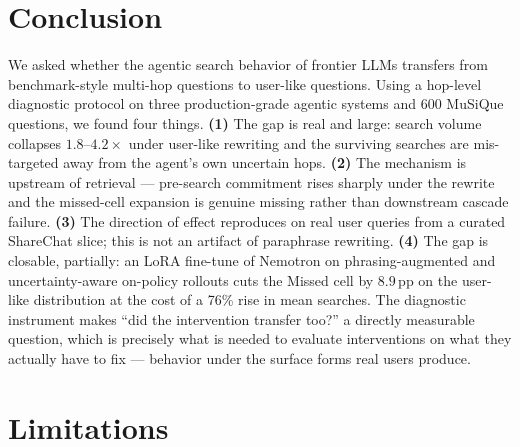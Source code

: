 \documentclass[10pt,letterpaper]{article}
\begin{document}
\section{Conclusion}\label{sec:conclusion}

We asked whether the agentic search behavior of frontier LLMs transfers from
benchmark-style multi-hop questions to user-like questions. Using a hop-level
diagnostic protocol on three production-grade agentic systems and 600 MuSiQue
questions, we found four things. \textbf{(1)} The gap is real and large: search
volume collapses $1.8$--$4.2{\times}$ under user-like rewriting and the surviving
searches are mis-targeted away from the agent's own uncertain hops.
\textbf{(2)} The mechanism is upstream of retrieval --- pre-search commitment
rises sharply under the rewrite and the missed-cell expansion is genuine missing
rather than downstream cascade failure. \textbf{(3)} The direction of effect
reproduces on real user queries from a curated ShareChat slice; this is not an
artifact of paraphrase rewriting. \textbf{(4)} The gap is closable, partially:
an LoRA fine-tune of Nemotron on phrasing-augmented and uncertainty-aware
on-policy rollouts cuts the Missed cell by $8.9$\,pp on the user-like
distribution at the cost of a 76\% rise in mean searches. The diagnostic
instrument makes ``did the intervention transfer too?'' a directly measurable
question, which is precisely what is needed to evaluate interventions on what
they actually have to fix --- behavior under the surface forms real users
produce.

\section*{Limitations}
\end{document}
